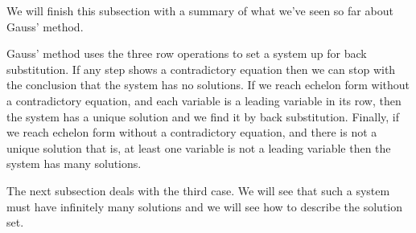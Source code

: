 We will finish this subsection with a summary of
what we've seen so far about Gauss' method.

Gauss' method uses the three row operations to 
set a system up for back substitution.
If any step shows a contradictory equation then we can stop with the
conclusion that the system has no solutions.
If we reach echelon form without a contradictory equation,
and each variable is a leading variable in its
row, then the system has a unique solution and we find it by
back substitution.
Finally, if we reach echelon form without a contradictory equation,
and there is not a unique solution\Dash
that is, at least one variable is not a leading variable\Dash
then the system has many solutions.

The next subsection deals with the third case.
We will see that such a system must have infinitely many solutions
and we will see how to describe the
solution set.


